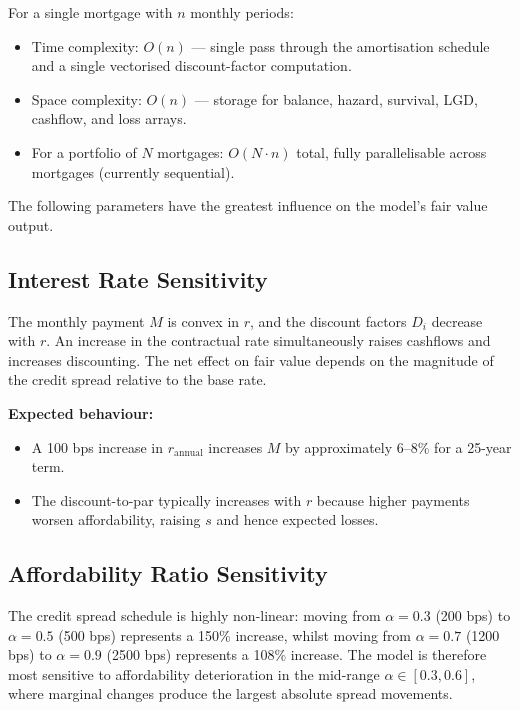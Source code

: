 \documentclass[11pt,a4paper]{article}
\begin{document}
For a single mortgage with $n$ monthly periods:
\begin{itemize}[nosep]
    \item Time complexity: $O(n)$ --- single pass through the amortisation schedule
          and a single vectorised discount-factor computation.
    \item Space complexity: $O(n)$ --- storage for balance, hazard, survival, LGD,
          cashflow, and loss arrays.
    \item For a portfolio of $N$ mortgages: $O(N \cdot n)$ total, fully parallelisable
          across mortgages (currently sequential).
\end{itemize}

\mkmsensitivity

The following parameters have the greatest influence on the model's fair value output.



\subsection{Interest Rate Sensitivity}

The monthly payment $M$ is convex in $r$, and the discount factors $D_i$ decrease with
$r$. An increase in the contractual rate simultaneously raises cashflows and increases
discounting. The net effect on fair value depends on the magnitude of the credit spread
relative to the base rate.

\textbf{Expected behaviour:}
\begin{itemize}[nosep]
    \item A 100 bps increase in $r_{\text{annual}}$ increases $M$ by approximately 6--8\%
          for a 25-year term.
    \item The discount-to-par typically increases with $r$ because higher payments
          worsen affordability, raising $s$ and hence expected losses.
\end{itemize}

\subsection{Affordability Ratio Sensitivity}

The credit spread schedule is highly non-linear: moving from $\alpha = 0.3$ (200 bps) to
$\alpha = 0.5$ (500 bps) represents a 150\% increase, whilst moving from $\alpha = 0.7$
(1200 bps) to $\alpha = 0.9$ (2500 bps) represents a 108\% increase. The model is
therefore most sensitive to affordability deterioration in the mid-range
$\alpha \in [0.3, 0.6]$, where marginal changes produce the largest absolute spread
movements.
\end{document}

